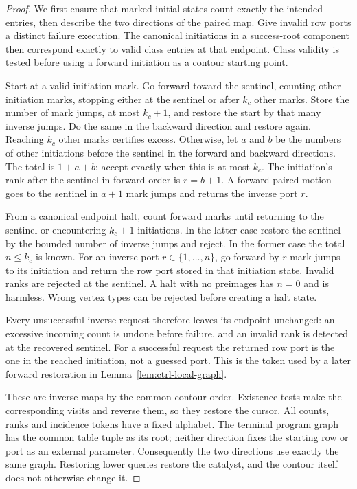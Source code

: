 \documentclass[11pt]{article}
\numberwithin{equation}{section}
\theoremstyle{definition}
\theoremstyle{remark}
\begin{document}
\begin{proof}
We first ensure that marked initial states count exactly the intended entries, then describe the two directions of the paired map. Give invalid row ports a distinct failure execution.  The canonical
initiations in a success-root component then correspond exactly to
valid class entries at that endpoint.  Class validity is tested before
using a forward initiation as a contour starting point.

Start at a valid initiation mark.  Go forward toward the sentinel,
counting other initiation marks, stopping either at the sentinel or
after ${k}_c$ other marks.  Store the number of mark jumps, at most
${k}_c+1$, and restore the start by that many inverse jumps.  Do the same
in the backward direction and restore again.  Reaching ${k}_c$ other
marks certifies excess.  Otherwise, let $a$ and $b$ be the numbers of
other initiations before the sentinel in the forward and backward
directions.  The total is $1+a+b$; accept exactly when this is at most
${k}_c$.  The initiation's rank after the sentinel in forward order is
$r=b+1$.  A forward paired motion goes to the sentinel in $a+1$ mark
jumps and returns the inverse port $r$.

From a canonical endpoint halt, count forward marks until returning to
the sentinel or encountering ${k}_c+1$ initiations.  In the latter case
restore the sentinel by the bounded number of inverse jumps and
reject.  In the former case the total $n\le {k}_c$ is known.  For an
inverse port $r\in\{1,\ldots,n\}$, go forward by $r$ mark jumps to its
initiation and return the row port stored in that initiation state.
Invalid ranks are rejected at the sentinel.  A halt with no preimages
has $n=0$ and is harmless.  Wrong vertex types can be rejected before
creating a halt state.

Every unsuccessful inverse request therefore leaves its endpoint
unchanged: an excessive incoming count is undone before failure, and an
invalid rank is detected at the recovered sentinel.  For a successful
request the returned row port is the one in the reached initiation,
not a guessed port.  This is the token used by a later forward
restoration in Lemma~\ref{lem:ctrl-local-graph}.

These are inverse maps by the common contour order.  Existence tests
make the corresponding visits and reverse them, so they restore the
cursor.  All counts, ranks and incidence tokens have a fixed alphabet.
The terminal program graph has the common table tuple as its root;
neither direction fixes the starting row or port as an external
parameter.  Consequently the two directions use exactly the same
graph.  Restoring lower queries restore the catalyst, and the contour
itself does not otherwise change it.
\end{proof}
\end{document}
